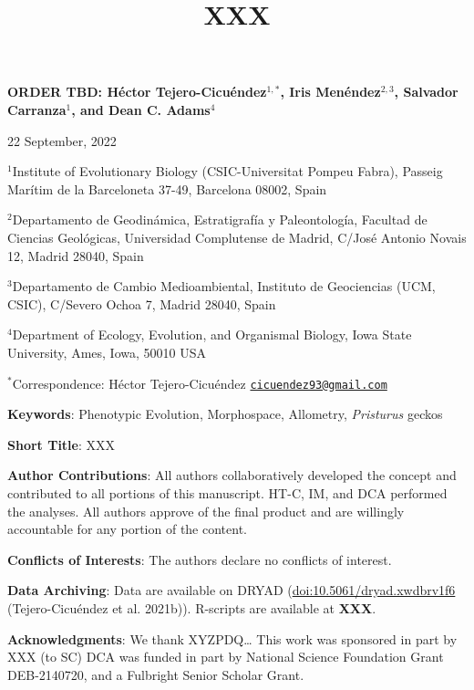 \documentclass[
]{article}
\title{XXX}
\author{}
\date{\vspace{-2.5em}}
\begin{document}
\maketitle

\begin{center}
\textbf{ORDER TBD:  H{\'{e}}ctor Tejero-Cicu{\'{e}}ndez$^{1,*}$,  Iris Men{\'{e}}ndez$^{2,3}$, Salvador Carranza$^{1}$, and Dean C. Adams$^{4}$} 
\end{center}

\begin{center}22 September, 2022\end{center}

\(^{1}\)Institute of Evolutionary Biology (CSIC-Universitat Pompeu
Fabra), Passeig Marítim de la Barceloneta 37-49, Barcelona 08002, Spain

\(^{2}\)Departamento de Geodinámica, Estratigrafía y Paleontología,
Facultad de Ciencias Geológicas, Universidad Complutense de Madrid,
C/José Antonio Novais 12, Madrid 28040, Spain

\(^{3}\)Departamento de Cambio Medioambiental, Instituto de Geociencias
(UCM, CSIC), C/Severo Ochoa 7, Madrid 28040, Spain

\(^{4}\)Department of Ecology, Evolution, and Organismal Biology, Iowa
State University, Ames, Iowa, 50010 USA

\(^{*}\)Correspondence: Héctor Tejero-Cicuéndez
\href{mailto:cicuendez93@gmail.com}{\nolinkurl{cicuendez93@gmail.com}}

\hfill\break

\textbf{Keywords}: Phenotypic Evolution, Morphospace, Allometry,
\emph{Pristurus} geckos \hfill\break

\textbf{Short Title}: XXX \hfill\break

\textbf{Author Contributions}: All authors collaboratively developed the
concept and contributed to all portions of this manuscript. HT-C, IM,
and DCA performed the analyses. All authors approve of the final product
and are willingly accountable for any portion of the
content.\hfill\break

\textbf{Conflicts of Interests}: The authors declare no conflicts of
interest.\hfill\break

\textbf{Data Archiving}: Data are available on DRYAD
(\url{doi:10.5061/dryad.xwdbrv1f6} (Tejero-Cicuéndez et al. 2021b)).
R-scripts are available at \textbf{XXX}. \hfill\break

\textbf{Acknowledgments}: We thank XYZPDQ\ldots{} This work was
sponsored in part by XXX (to SC) DCA was funded in part by National
Science Foundation Grant DEB-2140720, and a Fulbright Senior Scholar
Grant.
\end{document}
